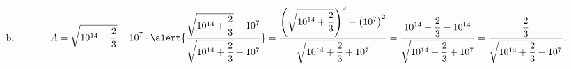 \begin{frame}
\begin{solution}
\begin{enumerate}[a)]
\begin{equation*}
                    
		  \end{equation*}  
    
			\item
			      \begin{equation*}
				      A=
				      \sqrt{10^{14}+\dfrac{2}{3}}-10^{7}\cdot
				      \alert{
				      \dfrac{
				      \sqrt{10^{14}+\dfrac{2}{3}}+10^{7}
				      }{
				      \sqrt{10^{14}+\dfrac{2}{3}}+10^{7}
				      }
				      }=
				      \dfrac{
				      \left(
				      \sqrt{10^{14}+\dfrac{2}{3}}
				      \right)^{2}
				      -{\left(
				      10^{7}
				      \right)}^{2}
				      }{
				      \sqrt{10^{14}+\dfrac{2}{3}}+10^{7}
				      }
				      =
				      \dfrac{
				      10^{14}+\dfrac{2}{3}-10^{14}
				      }{
				      \sqrt{10^{14}+\dfrac{2}{3}}+10^{7}
				      }=
				      \dfrac{\dfrac{2}{3}}{
				      \sqrt{10^{14}+\dfrac{2}{3}}+10^{7}
				      }.
			      \end{equation*}
		\end{enumerate}
	\end{solution}
\end{frame}
